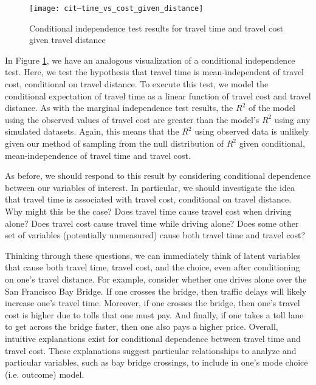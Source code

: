 \begin{figure}
   \centering
   \texttt{[image: cit--time\_vs\_cost\_given\_distance]}
   \caption{Conditional independence test results for travel time and travel cost given travel distance}
   \label{fig:conditional-independence-test}
\end{figure}
In Figure \ref{fig:conditional-independence-test}, we have an analogous visualization of a conditional independence test.
Here, we test the hypothesis that travel time is mean-independent of travel cost, conditional on travel distance.
To execute this test, we model the conditional expectation of travel time as a linear function of travel cost and travel distance.
As with the marginal independence test results, the $R^2$ of the model using the observed values of travel cost are greater than the model's $R^2$ using any simulated datasets.
Again, this means that the $R^2$ using observed data is unlikely given our method of sampling from the null distribution of $R^2$ given conditional, mean-independence of travel time and travel cost.

As before, we should respond to this result by considering conditional dependence between our variables of interest.
In particular, we should investigate the idea that travel time is associated with travel cost, conditional on travel distance.
Why might this be the case?
Does travel time cause travel cost when driving alone?
Does travel cost cause travel time while driving alone?
Does some other set of variables (potentially unmeasured) cause both travel time and travel cost?

Thinking through these questions, we can immediately think of latent variables that cause both travel time, travel cost, and the choice, even after conditioning on one's travel distance.
For example, consider whether one drives alone over the San Francisco Bay Bridge.
If one crosses the bridge, then traffic delays will likely increase one's travel time.
Moreover, if one crosses the bridge, then one's travel cost is higher due to tolls that one must pay.
And finally, if one takes a toll lane to get across the bridge faster, then one also pays a higher price.
Overall, intuitive explanations exist for conditional dependence between travel time and travel cost.
These explanations suggest particular relationships to analyze and particular variables, such as bay bridge crossings, to include in one's mode choice (i.e. outcome) model.

